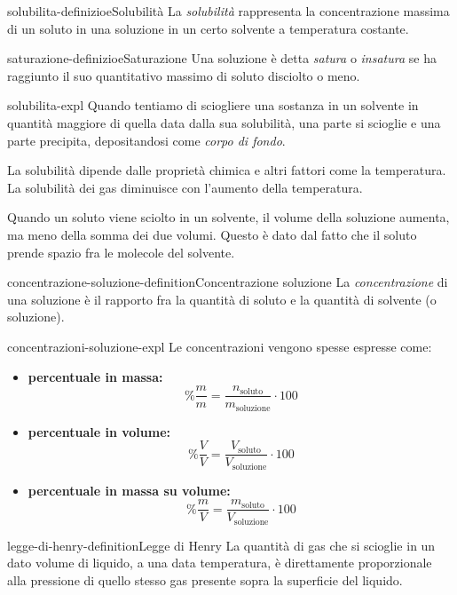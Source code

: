 \documentclass[preview]{standalone}
\begin{document}
\genpage

\begin{snippetdefinition}{solubilita-definizioe}{Solubilità}
    La \textit{solubilità} rappresenta la concentrazione massima di un soluto
    in una soluzione in un certo solvente a temperatura costante.
\end{snippetdefinition}

\begin{snippetdefinition}{saturazione-definizioe}{Saturazione}
    Una soluzione è detta \textit{satura} o \textit{insatura}
    se ha raggiunto il suo quantitativo massimo di soluto disciolto o meno.
\end{snippetdefinition}

\begin{snippet}{solubilita-expl}
    Quando tentiamo di sciogliere una sostanza in un solvente in quantità maggiore
    di quella data dalla sua solubilità, una parte si scioglie e una parte precipita,
    depositandosi come \textit{corpo di fondo}.

    La solubilità dipende dalle proprietà chimica e altri fattori come la temperatura. \\
    La solubilità dei gas diminuisce con l'aumento della temperatura.

    Quando un soluto viene sciolto in un solvente, il volume della soluzione aumenta,
    ma meno della somma dei due volumi. Questo è dato dal fatto che il soluto prende spazio fra le molecole del solvente.
\end{snippet}

\begin{snippetdefinition}{concentrazione-soluzione-definition}{Concentrazione soluzione}
    La \textit{concentrazione} di una soluzione è il rapporto
    fra la quantità di soluto e la quantità di solvente (o soluzione).
\end{snippetdefinition}

\begin{snippet}{concentrazioni-soluzione-expl}
    Le concentrazioni vengono spesse espresse come:
    \begin{itemize}
        \item \textbf{percentuale in massa: }
        \[\%\frac{m}{m} = \frac{n_{\text{soluto}}}{m_{\text{soluzione}}}\cdot100\]
    
        \item \textbf{percentuale in volume: }
        \[\%\frac{V}{V} = \frac{V_{\text{soluto}}}{V_{\text{soluzione}}}\cdot100\]
    
        \item \textbf{percentuale in massa su volume: }
        \[\%\frac{m}{V} = \frac{m_{\text{soluto}}}{V_{\text{soluzione}}}\cdot100\]
    \end{itemize}
\end{snippet}

\begin{snippetdefinition}{legge-di-henry-definition}{Legge di Henry}
    La quantità di gas che si scioglie in un dato volume di liquido, a una data temperatura, è direttamente
    proporzionale alla pressione di quello stesso gas presente sopra la superficie del liquido.
\end{snippetdefinition}
\end{document}
